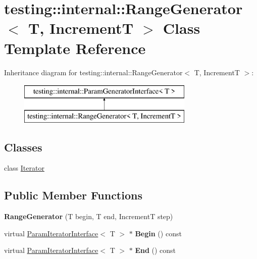 \hypertarget{classtesting_1_1internal_1_1_range_generator}{}\section{testing\+:\+:internal\+:\+:Range\+Generator$<$ T, IncrementT $>$ Class Template Reference}
\label{classtesting_1_1internal_1_1_range_generator}
Inheritance diagram for testing\+:\+:internal\+:\+:Range\+Generator$<$ T, IncrementT $>$\+:\begin{figure}[H]
\begin{center}
\leavevmode
\includegraphics[height=2.000000cm]{classtesting_1_1internal_1_1_range_generator}
\end{center}
\end{figure}
\subsection*{Classes}
\begin{DoxyCompactItemize}
\item 
class \mbox{\hyperlink{classtesting_1_1internal_1_1_range_generator_1_1_iterator}{Iterator}}
\end{DoxyCompactItemize}
\subsection*{Public Member Functions}
\begin{DoxyCompactItemize}
\item 
\mbox{\label{classtesting_1_1internal_1_1_range_generator_a5b3b83223b9cada3569bcee729e0fdf3}} 
{\bfseries Range\+Generator} (T begin, T end, IncrementT step)
\item 
\mbox{\label{classtesting_1_1internal_1_1_range_generator_ae68b59f9348ecf93e0947545a2424765}} 
virtual \mbox{\hyperlink{classtesting_1_1internal_1_1_param_iterator_interface}{Param\+Iterator\+Interface}}$<$ T $>$ $\ast$ {\bfseries Begin} () const
\item 
\mbox{\label{classtesting_1_1internal_1_1_range_generator_a8d2acbb733791a14df6e7bd3754e9003}} 
virtual \mbox{\hyperlink{classtesting_1_1internal_1_1_param_iterator_interface}{Param\+Iterator\+Interface}}$<$ T $>$ $\ast$ {\bfseries End} () const
\end{DoxyCompactItemize}
